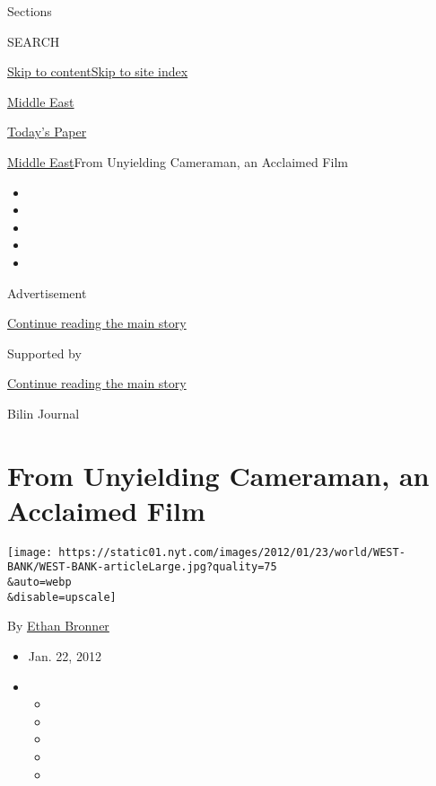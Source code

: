 Sections

SEARCH

\protect\hyperlink{site-content}{Skip to
content}\protect\hyperlink{site-index}{Skip to site index}

\href{https://www.nytimes.com/section/world/middleeast}{Middle East}

\href{https://myaccount.nytimes.com/auth/login?response_type=cookie\&client_id=vi}{}

\href{https://www.nytimes.com/section/todayspaper}{Today's Paper}

\href{/section/world/middleeast}{Middle East}\textbar{}From Unyielding
Cameraman, an Acclaimed Film

\begin{itemize}
\item
\item
\item
\item
\item
\end{itemize}

Advertisement

\protect\hyperlink{after-top}{Continue reading the main story}

Supported by

\protect\hyperlink{after-sponsor}{Continue reading the main story}

Bilin Journal

\hypertarget{from-unyielding-cameraman-an-acclaimed-film}{%
\section{From Unyielding Cameraman, an Acclaimed
Film}\label{from-unyielding-cameraman-an-acclaimed-film}}

\texttt{[image: https://static01.nyt.com/images/2012/01/23/world/WEST-BANK/WEST-BANK-articleLarge.jpg?quality=75\\\&auto=webp\\\&disable=upscale]}

By \href{https://www.nytimes.com/by/ethan-bronner}{Ethan Bronner}

\begin{itemize}
\item
  Jan. 22, 2012
\item
  \begin{itemize}
  \item
  \item
  \item
  \item
  \item
  \end{itemize}
\end{itemize}

